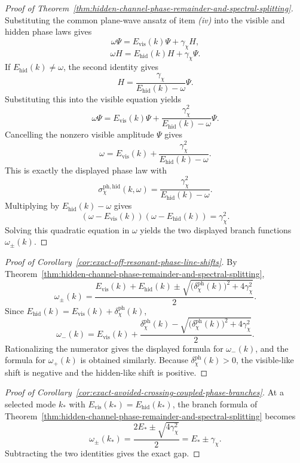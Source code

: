 \begin{proof}[Proof of Theorem~\ref{thm:hidden-channel-phase-remainder-and-spectral-splitting}]
\label{proof:thm:hidden-channel-phase-remainder-and-spectral-splitting}
Substituting the common plane-wave ansatz of item \emph{(iv)} into the visible
and hidden phase laws gives
\[
\omega\Psi
=
E_{\mathrm{vis}}(k)\Psi+\gamma_{\chi}H,
\]
\[
\omega H
=
E_{\mathrm{hid}}(k)H+\gamma_{\chi}\Psi.
\]
If \(E_{\mathrm{hid}}(k)\neq \omega\), the second identity gives
\[
H
=
\frac{\gamma_{\chi}}{E_{\mathrm{hid}}(k)-\omega}\Psi.
\]
Substituting this into the visible equation yields
\[
\omega\Psi
=
E_{\mathrm{vis}}(k)\Psi
+
\frac{\gamma_{\chi}^2}{E_{\mathrm{hid}}(k)-\omega}\Psi.
\]
Cancelling the nonzero visible amplitude \(\Psi\) gives
\[
\omega
=
E_{\mathrm{vis}}(k)
+
\frac{\gamma_{\chi}^2}{E_{\mathrm{hid}}(k)-\omega}.
\]
This is exactly the displayed phase law with
\[
\sigma_{\chi}^{\mathrm{ph,hid}}(k,\omega)
=
\frac{\gamma_{\chi}^2}{E_{\mathrm{hid}}(k)-\omega}.
\]
Multiplying by \(E_{\mathrm{hid}}(k)-\omega\) gives
\[
(\omega-E_{\mathrm{vis}}(k))
(\omega-E_{\mathrm{hid}}(k))
=
\gamma_{\chi}^2.
\]
Solving this quadratic equation in \(\omega\) yields the two displayed branch
functions \(\omega_{\pm}(k)\).
\end{proof}

\begin{proof}[Proof of Corollary~\ref{cor:exact-off-resonant-phase-line-shifts}]
\label{proof:cor:exact-off-resonant-phase-line-shifts}
By
Theorem~\ref{thm:hidden-channel-phase-remainder-and-spectral-splitting},
\[
\omega_{\pm}(k)
=
\frac{
E_{\mathrm{vis}}(k)+E_{\mathrm{hid}}(k)
\pm
\sqrt{
\bigl(\delta_{\chi}^{\mathrm{ph}}(k)\bigr)^2+4\gamma_{\chi}^2
}
}{2}.
\]
Since \(E_{\mathrm{hid}}(k)=E_{\mathrm{vis}}(k)+\delta_{\chi}^{\mathrm{ph}}(k)\),
\[
\omega_-(k)
=
E_{\mathrm{vis}}(k)
+
\frac{
\delta_{\chi}^{\mathrm{ph}}(k)
-
\sqrt{
\bigl(\delta_{\chi}^{\mathrm{ph}}(k)\bigr)^2+4\gamma_{\chi}^2
}
}{2}.
\]
Rationalizing the numerator gives the displayed formula for \(\omega_-(k)\),
and the formula for \(\omega_+(k)\) is obtained similarly. Because
\(\delta_{\chi}^{\mathrm{ph}}(k)>0\), the visible-like shift is negative and
the hidden-like shift is positive.
\end{proof}

\begin{proof}[Proof of Corollary~\ref{cor:exact-avoided-crossing-coupled-phase-branches}]
\label{proof:cor:exact-avoided-crossing-coupled-phase-branches}
At a selected mode \(k_\ast\) with
\(E_{\mathrm{vis}}(k_\ast)=E_{\mathrm{hid}}(k_\ast)\), the branch formula of
Theorem~\ref{thm:hidden-channel-phase-remainder-and-spectral-splitting} becomes
\[
\omega_{\pm}(k_\ast)
=
\frac{2E_\ast\pm\sqrt{4\gamma_{\chi}^2}}{2}
=
E_\ast\pm\gamma_{\chi}.
\]
Subtracting the two identities gives the exact gap.
\end{proof}

